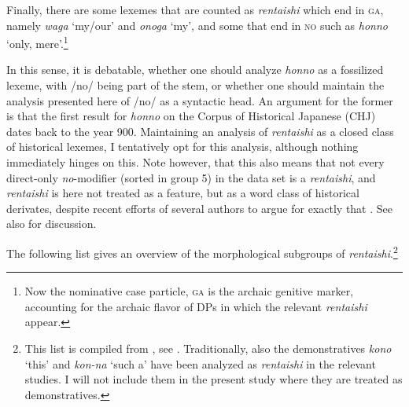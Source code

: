 \documentclass [output=book,colorlinks,citecolor=brown]{langscibook}
\begin{document}
Finally, there are some lexemes that are counted as \textit{rentaishi} which end in \textsc{ga}, namely \textit{waga} `my/our' and \textit{onoga} `my’, and some that end in \textsc{no} such as \textit{honno} `only, mere’.\footnote{Now the nominative case particle, \textsc{ga} is the archaic genitive marker, accounting for the archaic flavor of DPs in which the relevant \textit{rentaishi} appear.}

In this sense, it is debatable, whether one should analyze \textit{honno} as a fossilized lexeme, with /no/ being part of the stem, or whether one should maintain the analysis presented here of /no/ as a syntactic head. An argument for the former is that the first result for \textit{honno} on the Corpus of Historical Japanese (CHJ) dates back to the year 900. Maintaining an analysis of \textit{rentaishi} as a closed class of historical lexemes, I tentatively opt for this analysis, although nothing immediately hinges on this. Note however, that this also means that not every direct-only \textit{no}-modifier (sorted in group 5) in the data set is a \textit{rentaishi}, and \textit{rentaishi} is here not treated as a feature, but as a word class of historical derivates, despite recent efforts of several authors to argue for exactly that \citep{muraki:1996:imi, muraki:2009:nihongo, muraki:2012:nihongo, muraki:2015:hinshi, oshima:2021:nihongo, oshima:2021:redefining, oshima:2021:nihongo, abe:2022:no}. See also \citet{kohlich:2023:uninflecting} for discussion. %

The following list gives an overview of the morphological subgroups of \textit{rentaishi}.\footnote{This list is compiled from \citet{mitsuya:1932:bunpo, kieda:1938:koto, suzuki:1972:nihon, komatsu:1973:rentaishi, tokieda:1941:kokugogaku, mio:1958:hanashi, kai:1980:rentaishi, kim:2006:kindai, matsubara:2009:nihongo}, see \citet[181–182]{kohlich:2020:rentaishi}. Traditionally, also the demonstratives \textit{kono} `this' and \textit{kon-na} `such a’ have been analyzed as \textit{rentaishi} in the relevant studies. I will not include them in the present study where they are treated as demonstratives.}
\end{document}
